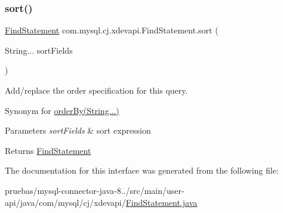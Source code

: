 \subsubsection{\texorpdfstring{sort()}{sort()}}
{\footnotesize\ttfamily \mbox{\hyperlink{interfacecom_1_1mysql_1_1cj_1_1xdevapi_1_1_find_statement}{Find\+Statement}} com.\+mysql.\+cj.\+xdevapi.\+Find\+Statement.\+sort (\begin{DoxyParamCaption}\item[{String...}]{sort\+Fields }\end{DoxyParamCaption})}

Add/replace the order specification for this query. 

Synonym for \mbox{\hyperlink{}{order\+By(\+String...)}}


\begin{DoxyParams}{Parameters}
{\em sort\+Fields} & sort expression \\
\hline
\end{DoxyParams}
\begin{DoxyReturn}{Returns}
\mbox{\hyperlink{interfacecom_1_1mysql_1_1cj_1_1xdevapi_1_1_find_statement}{Find\+Statement}} 
\end{DoxyReturn}


The documentation for this interface was generated from the following file\+:\begin{DoxyCompactItemize}
\item 
pruebas/mysql-\/connector-\/java-\/8../src/main/user-\/api/java/com/mysql/cj/xdevapi/\mbox{\hyperlink{_find_statement_8java}{Find\+Statement.\+java}}\end{DoxyCompactItemize}
